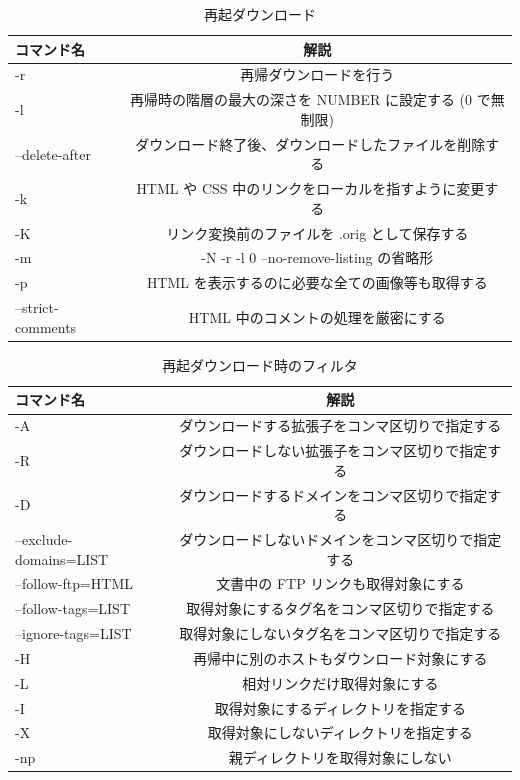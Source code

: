 \newpage

\begin{table}[H]
  \begin{center}
    \caption{再起ダウンロード}
    \begin{tabular}{|l|c|} \hline
      コマンド名 & 解説  \\ \hline
  -r & 再帰ダウンロードを行う \\
  -l & 再帰時の階層の最大の深さを NUMBER に設定する (0 で無制限) \\
--delete-after & ダウンロード終了後、ダウンロードしたファイルを削除する \\
  -k & HTML や CSS 中のリンクをローカルを指すように変更する \\
  -K & リンク変換前のファイルを .orig として保存する \\
  -m & -N -r -l 0 --no-remove-listing の省略形 \\
  -p & HTML を表示するのに必要な全ての画像等も取得する \\
--strict-comments & HTML 中のコメントの処理を厳密にする \\ \hline
    \end{tabular}
  \end{center}
\end{table}

\begin{table}[H]
  \begin{center}
    \caption{再起ダウンロード時のフィルタ}
    \begin{tabular}{|l|c|} \hline
      コマンド名 & 解説  \\ \hline
  -A & ダウンロードする拡張子をコンマ区切りで指定する \\
  -R & ダウンロードしない拡張子をコンマ区切りで指定する \\
  -D & ダウンロードするドメインをコンマ区切りで指定する \\
--exclude-domains=LIST & ダウンロードしないドメインをコンマ区切りで指定する \\
--follow-ftp=HTML & 文書中の FTP リンクも取得対象にする \\
--follow-tags=LIST & 取得対象にするタグ名をコンマ区切りで指定する \\
--ignore-tags=LIST & 取得対象にしないタグ名をコンマ区切りで指定する \\
  -H & 再帰中に別のホストもダウンロード対象にする \\
  -L & 相対リンクだけ取得対象にする \\
  -I & 取得対象にするディレクトリを指定する \\
  -X & 取得対象にしないディレクトリを指定する \\
  -np & 親ディレクトリを取得対象にしない \\ \hline
 \end{tabular}
  \end{center}
\end{table}


